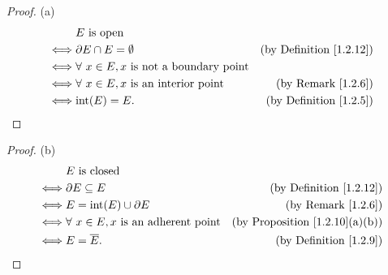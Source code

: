 \begin{proof}{(a)}
    \begin{align*}
             & E \text{ is open}                                                                         \\
        \iff & \partial E \cap E = \emptyset                       & \text{(by Definition \ref{1.2.12})} \\
        \iff & \forall\ x \in E, x \text{ is not a boundary point}                                       \\
        \iff & \forall\ x \in E, x \text{ is an interior point}    & \text{(by Remark \ref{1.2.6})}      \\
        \iff & \text{int}(E) = E.                                  & \text{(by Definition \ref{1.2.5})}
    \end{align*}
\end{proof}

\begin{proof}{(b)}
    \begin{align*}
             & E \text{ is closed}                                                                           \\
        \iff & \partial E \subseteq E                           & \text{(by Definition \ref{1.2.12})}        \\
        \iff & E = \text{int}(E) \cup \partial E                & \text{(by Remark \ref{1.2.6})}             \\
        \iff & \forall\ x \in E, x \text{ is an adherent point} & \text{(by Proposition \ref{1.2.10}(a)(b))} \\
        \iff & E = \overline{E}.                                & \text{(by Definition \ref{1.2.9})}
    \end{align*}
\end{proof}

